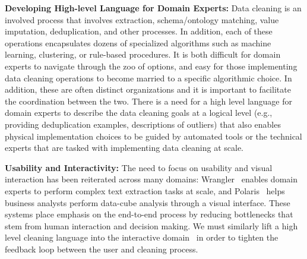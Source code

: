 

\noindent\textbf{Developing High-level Language for Domain Experts:} Data cleaning is an involved process that involves extraction, schema/ontology matching, value imputation, deduplication, and other processes.  In addition, each of these operations encapsulates dozens of specialized algorithms such as machine learning, clustering, or rule-based procedures.  It is both difficult for domain experts to navigate through the zoo of options, and easy for those implementing data cleaning operations to become married to a specific algorithmic choice.  In addition, these are often distinct organizations and it is important to facilitate the coordination between the two.   There is a need for a high level language for domain experts to describe the data cleaning goals at a logical level (e.g., providing deduplication examples, descriptions of outliers) that also enables physical implementation choices to be guided by automated tools or the technical experts that are tasked with implementing data cleaning at scale. {\color{red}{more details?}}


\noindent\textbf{Usability and Interactivity:} The need to focus on usability and visual interaction has been reiterated across many domains:  Wrangler~\cite{kandel2011wrangler} enables domain experts to perform complex text extraction tasks at scale, and  Polaris~\cite{stolte2002polaris} helps business analysts perform data-cube analysis through a visual interface. These systems place emphasis on the end-to-end process by reducing bottlenecks that stem from human interaction and decision making.    We must similarly lift a high level cleaning language into the interactive domain~\cite{heer2015predictive} in order to tighten the feedback loop between the user and cleaning process.

% 

